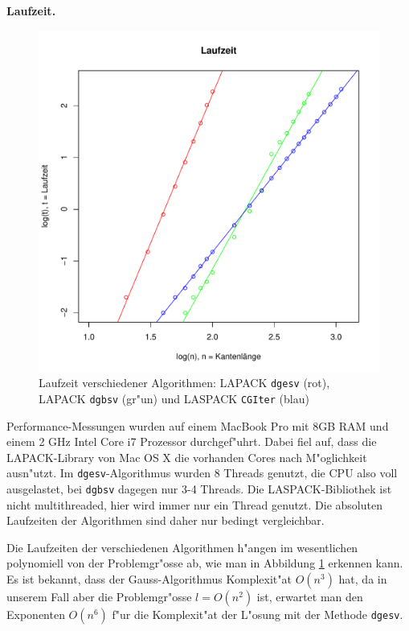 {\bf Laufzeit.}
\begin{figure}
\begin{center}
\includegraphics[width=\hsize]{graphics/runtime}
\end{center}
\caption{Laufzeit verschiedener Algorithmen: LAPACK {\tt dgesv} (rot),
LAPACK {\tt dgbsv} (gr"un)
und LASPACK {\tt CGIter} (blau)\label{runtime}}
\end{figure}
Performance-Messungen wurden auf einem MacBook Pro mit 8GB RAM und
einem 2 GHz Intel Core i7 Prozessor durchgef"uhrt. Dabei fiel auf, dass
die LAPACK-Library von Mac OS X die vorhanden Cores nach M"oglichkeit
ausn"utzt. Im {\tt dgesv}-Algorithmus wurden 8 Threads genutzt, die
CPU also voll ausgelastet, bei {\tt dgbsv} dagegen nur 3-4 Threads.
Die LASPACK-Bibliothek ist nicht multithreaded, hier wird immer nur ein
Thread genutzt. Die absoluten Laufzeiten der Algorithmen sind daher nur
bedingt vergleichbar.


Die Laufzeiten der verschiedenen Algorithmen h"angen im wesentlichen
polynomiell von der Problemgr"osse ab, wie man in Abbildung \ref{runtime}
erkennen kann.  Es ist bekannt, dass der Gauss-Algorithmus Komplexit"at
$O(n^3)$ hat, da in unserem Fall aber die Problemgr"osse $l=O(n^2)$ ist,
erwartet man den Exponenten $O(n^6)$ f"ur die Komplexit"at der L"osung
mit der Methode {\tt dgesv}.

